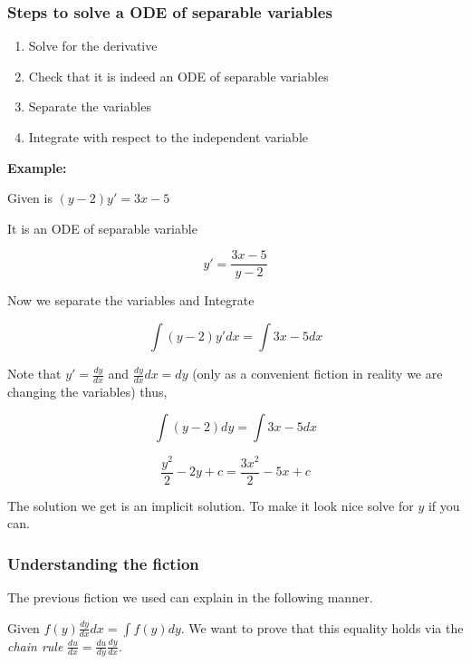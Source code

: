 \subsubsection{Steps to solve a ODE of separable variables}

\begin{enumerate}

    \item Solve for the derivative

    \item Check that it is indeed an ODE of separable variables

    \item Separate the variables

    \item Integrate with respect to the independent variable

\end{enumerate}

\textbf{Example:}
\vspace{\baselineskip}

Given is \((y - 2)y' = 3x - 5\)

It is an ODE of separable variable

\[
    y' = \frac{3x - 5}{y - 2}
\]

Now we separate the variables and Integrate

\[
    \int (y - 2)y' dx = \int 3x - 5 dx
\]

Note that \(y' = \frac{dy}{dx}\) and \( \frac{dy}{dx} dx = dy\) (only as a convenient fiction
in reality we are changing the variables) thus,

\[
    \int (y - 2)dy = \int 3x - 5 dx
\]

\[
    \frac{y^2}{2} - 2y + c = \frac{3x^2}{2} - 5x + c
\]

The solution we get is an implicit solution. To make it look nice solve for \(y\)
if you can.

\subsubsection{Understanding the fiction}

The previous fiction we used can explain in the following manner.
\vspace{\baselineskip}

Given \( f(y) \frac{dy}{dx} dx = \int f(y) dy\). We want to prove that this equality holds via the 
\emph{chain rule} \(\frac{du}{dx} = \frac{du}{dy} \frac{dy}{dx}\).


